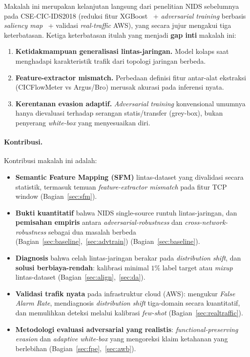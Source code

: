 \documentclass[11pt,a4paper]{article}
\begin{document}
Makalah ini merupakan kelanjutan langsung dari penelitian NIDS sebelumnya pada
CSE-CIC-IDS2018 (reduksi fitur XGBoost~\cite{xgboost} + \emph{adversarial
training} berbasis \emph{saliency map}~\cite{saliency} + validasi
\emph{real-traffic} AWS), yang
secara jujur mengakui tiga keterbatasan. Ketiga keterbatasan itulah yang menjadi
\textbf{gap inti} makalah ini:
\begin{enumerate}
  \item \textbf{Ketidakmampuan generalisasi lintas-jaringan.} Model kolaps saat
  menghadapi karakteristik trafik dari topologi jaringan berbeda.
  \item \textbf{Feature-extractor mismatch.} Perbedaan definisi fitur antar-alat
  ekstraksi (CICFlowMeter vs Argus/Bro) merusak akurasi pada inferensi nyata.
\ifadversarial
  \item \textbf{Kerentanan evasion adaptif.} \emph{Adversarial training}
  konvensional umumnya hanya dievaluasi terhadap serangan statis/transfer
  (grey-box), bukan penyerang \emph{white-box} yang menyesuaikan diri.
\fi
\end{enumerate}

\paragraph{Kontribusi.} Kontribusi makalah ini adalah:
\begin{itemize}
  \item \textbf{Semantic Feature Mapping (SFM)} lintas-dataset yang divalidasi
  secara statistik, termasuk temuan \emph{feature-extractor mismatch} pada fitur
  TCP window (Bagian~\ref{sec:sfm}).
  \item \textbf{Bukti kuantitatif} bahwa NIDS single-source runtuh
  lintas-jaringan\ifadversarial, dan \textbf{pemisahan empiris} antara
  \emph{adversarial-robustness} dan \emph{cross-network-robustness} sebagai dua
  masalah berbeda (Bagian~\ref{sec:baseline},~\ref{sec:advtrain})\else{} (Bagian~\ref{sec:baseline})\fi.
  \item \textbf{Diagnosis} bahwa celah lintas-jaringan berakar pada
  \emph{distribution shift}, dan \textbf{solusi berbiaya-rendah}: kalibrasi
  minimal $1\%$ label target atau \emph{mixup} lintas-dataset
  (Bagian~\ref{sec:align},~\ref{sec:da}).
  \item \textbf{Validasi trafik nyata} pada infrastruktur cloud (AWS): mengukur
  \emph{False Alarm Rate}, mendiagnosis \emph{distribution shift} tiga-domain
  secara kuantitatif, dan memulihkan deteksi melalui kalibrasi \emph{few-shot}
  (Bagian~\ref{sec:realtraffic}).
\ifadversarial
  \item \textbf{Metodologi evaluasi adversarial yang realistis}:
  \emph{functional-preserving evasion} dan \emph{adaptive white-box} yang
  mengoreksi klaim ketahanan yang berlebihan (Bagian~\ref{sec:fpe},~\ref{sec:awb}).
\fi
\end{itemize}
\end{document}
